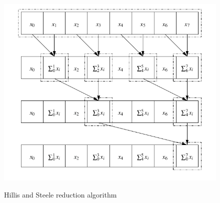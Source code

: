 \documentclass[Ingles]{ic-tese-v1}
\begin{document}
\begin{figure}[t]
	\centering
	\caption{Hillis and Steele reduction algorithm}
	\includegraphics[scale=0.5]{images/reduction.png}
	\label{fig:reductionhillis}
\end{figure}
\end{document}
